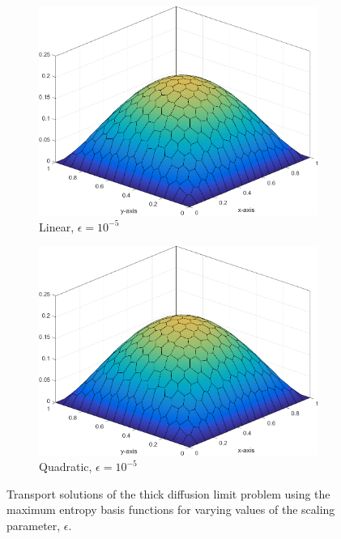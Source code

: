\begin{figure}
{\begin{subfigure}[b]{0.465\textwidth}
		\centering
		\label{subfig::DL_trans_me1_e5}
		\includegraphics[width=\textwidth]{figures/sec_BF/Sq_poly_MAXENT_k=1_ep=1e-5.png}
		\caption{Linear, $\epsilon = 10^{-5}$}
	\end{subfigure}
	\hfill
	\begin{subfigure}[b]{0.465\textwidth}
		\centering
		\label{subfig::DL_trans_me2_e5}
		\includegraphics[width=\textwidth]{figures/sec_BF/Sq_poly_MAXENT_k=2_ep=1e-5.png}
		\caption{Quadratic, $\epsilon = 10^{-5}$}
	\end{subfigure}
}
\caption{Transport solutions of the thick diffusion limit problem using the maximum entropy basis functions for varying values of the scaling parameter, $\epsilon$.}
\label{fig::BF_Results_DL_MAXENT}
\end{figure}

